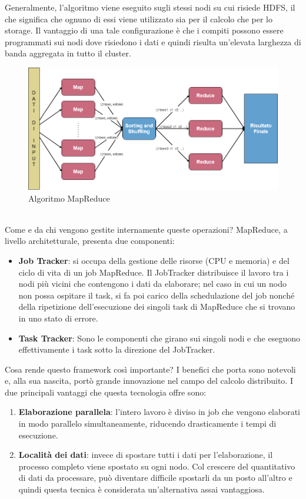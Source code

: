 Generalmente, l'algoritmo viene eseguito sugli stessi nodi su cui risiede HDFS, il che significa che ognuno di essi viene utilizzato sia per il calcolo che per lo storage. Il vantaggio di una tale configurazione è che i compiti possono essere programmati sui nodi dove risiedono i dati e quindi risulta un'elevata larghezza di banda aggregata in tutto il cluster.
\begin{figure}[hbt!]
    \centering
    \includegraphics[width=1\textwidth]{img/mapreduce.png}
    \caption{Algoritmo MapReduce}
    \label{fig:mapreduce}
\end{figure}\\

Come e da chi vengono gestite internamente queste operazioni? MapReduce, a livello architetturale, presenta due componenti: 
\begin{itemize}
    \item \textbf{Job Tracker}: si occupa della gestione delle risorse (CPU e memoria) e del ciclo di vita di un job MapReduce. Il JobTracker distribuisce il lavoro tra i nodi più vicini che contengono i dati da elaborare; nel caso in cui un nodo non possa ospitare il task, si fa poi carico della schedulazione del job nonché della ripetizione dell’esecuzione dei singoli task di MapReduce che si trovano in uno stato di errore. 
    \item \textbf{Task Tracker}: Sono le componenti che girano sui singoli nodi e che eseguono effettivamente i task sotto la direzione del JobTracker.
\end{itemize}

Cosa rende questo framework così importante? I benefici che porta sono notevoli e, alla sua nascita, portò grande innovazione nel campo del calcolo distribuito. I due principali vantaggi che questa tecnologia offre sono:
\begin{enumerate}
    \item \textbf{Elaborazione parallela}: l'intero lavoro è diviso in job che vengono elaborati in modo parallelo simultaneamente, riducendo drasticamente i tempi di esecuzione.
    \item \textbf{Località dei dati}: invece di spostare tutti i dati per l'elaborazione, il processo completo viene spostato su ogni nodo. Col crescere del quantitativo di dati da processare, può diventare difficile spostarli da un posto all'altro e quindi questa tecnica è considerata un'alternativa assai vantaggiosa.
\end{enumerate}

